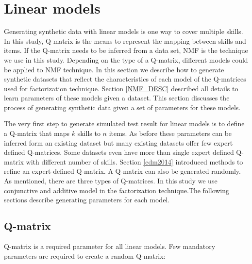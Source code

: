 \section{Linear models}
\label{LinearModelSynthetic}
Generating synthetic data with linear models is one way to cover multiple skills. In this study, Q-matrix is the means to represent the mapping between skills and items. If the Q-matrix needs to be inferred from a data set, NMF is the technique we use in this study. Depending on the type of a Q-matrix, different models could be applied to NMF technique. In this section we describe how to generate synthetic datasets that reflect the characteristics of each model of the Q-matrices used for factorization technique. Section \ref{NMF_DESC} described all details to learn parameters of these models given a dataset. This section discusses the process of generating synthetic data given a set of parameters for these models.

The very first step to generate simulated test result for linear models is to define a Q-matrix that maps $k$ skills to $n$ items. As before these parameters can be inferred form an existing dataset but many existing datasets offer few expert defined Q-matrices. Some datasets even have more than single expert defined Q-matrix with different number of skills. Section \ref{edm2014} introduced methods to refine an expert-defined Q-matrix. A Q-matrix can also be generated randomly. As mentioned, there are three types of Q-matrices. In this study we use conjunctive and additive model in the factorization technique.The following sections describe generating parameters for each model.

\subsection{Q-matrix}
\label{Q-MatrixObtain}
Q-matrix is a required parameter for all linear models. Few mandatory parameters are required to create a random Q-matrix:

